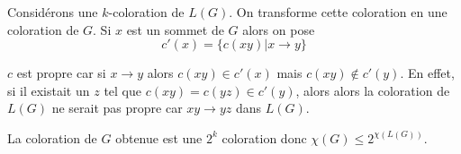 \begin{preuve}
	Considérons une $k$-coloration de $L(G)$. On transforme cette coloration en une coloration de $G$. Si $x$ est un sommet de $G$ alors on pose \[ c'(x) = \{ c(x y) | x \to y \} \]
	
	$c$ est propre car si $x \to y$ alors $c(x y) \in c'(x)$ mais $c(x y) \not\in c'(y)$. En effet, si il existait un $z$ tel que $c(x y) = c(y z) \in c'(y)$, alors alors la coloration de $L(G)$ ne serait pas propre car $x y \to y z$ dans $L(G)$.
	
	La coloration de $G$ obtenue est une $2^k$ coloration donc $\chi(G) \le 2^{\chi(L(G))}$.
\end{preuve}

